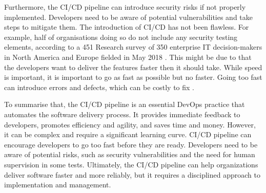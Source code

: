 Furthermore, the CI/CD pipeline can introduce security risks if not properly implemented. Developers need to be aware of potential vulnerabilities and take steps to mitigate them. The introduction of CI/CD has not been flawless. For example, half of organisations doing so do not include any security testing elements, according to a 451 Research survey of 350 enterprise IT decision-makers in North America and Europe fielded in May 2018 \cite{clark}. This might be due to that the developers want to deliver the features faster then it should take. While speed is important, it is important to go as fast as possible but no faster. Going too fast can introduce errors and defects, which can be costly to fix \cite{clark}. 

To summarise that, the CI/CD pipeline is an essential DevOps practice that automates the software delivery process. It provides immediate feedback to developers, promotes efficiency and agility, and saves time and money. However, it can be complex and require a significant learning curve. CI/CD pipeline can encourage developers to go too fast before they are ready. Developers need to be aware of potential risks, such as security vulnerabilities and the need for human supervision in some tests. Ultimately, the CI/CD pipeline can help organizations deliver software faster and more reliably, but it requires a disciplined approach to implementation and management.